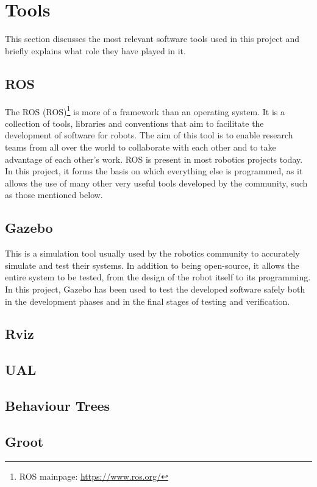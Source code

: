 \section{Tools}
\label{sec:Tools}
This section discusses the most relevant software tools used in this project and briefly explains what role they have played in it.


\subsection{ROS}
\label{subsec:ROS}
The \acrlong{ROS} (\acrshort{ROS})\footnote{ROS mainpage: \url{https://www.ros.org/}} is more of a framework than an operating system. It is a collection of tools, libraries and conventions that aim to facilitate the development of software for robots. The aim of this tool is to enable research teams from all over the world to collaborate with each other and to take advantage of each other's work. \gls{ROS} is present in most robotics projects today. In this project, it forms the basis on which everything else is programmed, as it allows the use of many other very useful tools developed by the community, such as those mentioned below.

\subsection{Gazebo}
\label{subsec:Gazebo}
This is a simulation tool usually used by the robotics community to accurately simulate and test their systems. In addition to being open-source, it allows the entire system to be tested, from the design of the robot itself to its programming. In this project, Gazebo has been used to test the developed software safely both in the development phases and in the final stages of testing and verification.

\subsection{Rviz}
\label{subsec:Rviz}

\subsection{UAL}
\label{subsec:UAL}

\subsection{Behaviour Trees}
\label{subsec:BehaviourTrees}

\subsection{Groot}
\label{subsec:Groot}



\endinput